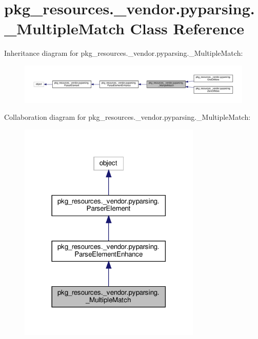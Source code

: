 \hypertarget{classpkg__resources_1_1__vendor_1_1pyparsing_1_1__MultipleMatch}{}\section{pkg\+\_\+resources.\+\_\+vendor.\+pyparsing.\+\_\+\+Multiple\+Match Class Reference}
\label{classpkg__resources_1_1__vendor_1_1pyparsing_1_1__MultipleMatch}


Inheritance diagram for pkg\+\_\+resources.\+\_\+vendor.\+pyparsing.\+\_\+\+Multiple\+Match\+:
\nopagebreak
\begin{figure}[H]
\begin{center}
\leavevmode
\includegraphics[width=350pt]{classpkg__resources_1_1__vendor_1_1pyparsing_1_1__MultipleMatch__inherit__graph}
\end{center}
\end{figure}


Collaboration diagram for pkg\+\_\+resources.\+\_\+vendor.\+pyparsing.\+\_\+\+Multiple\+Match\+:
\nopagebreak
\begin{figure}[H]
\begin{center}
\leavevmode
\includegraphics[width=246pt]{classpkg__resources_1_1__vendor_1_1pyparsing_1_1__MultipleMatch__coll__graph}
\end{center}
\end{figure}
